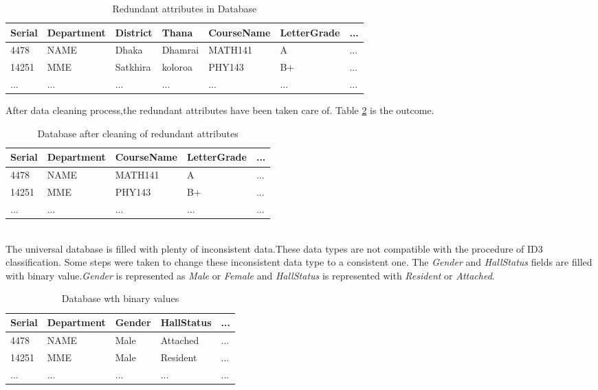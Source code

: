 \begin {table}[H]
\caption {Redundant attributes in Database} \label{tab:ti1}
\begin{center}
\begin{tabular}{ | m{1cm} | m{2cm}| m{1.5cm}| m{1.5cm} | m{2cm} | m{2cm} |  m{0.5cm} | } 
\hline
Serial & Department & District & Thana & CourseName & LetterGrade & ... \\ 
\hline
4478 & NAME & Dhaka & Dhamrai & MATH141 & A & ... \\ 
\hline
14251 & MME & Satkhira & koloroa & PHY143 & B+ & ... \\ 
\hline
... & ... & ... & ... & ... & ... & ... \\ 
\hline
\end{tabular}
\end{center}
\end{table}
After data cleaning process,the redundant attributes have been taken care of. Table \ref{tab:ti2} is the outcome. 
\begin {table}[!H]
\caption {Database after cleaning of redundant attributes} \label{tab:ti2}
\begin{center}
\begin{tabular}{ | m{1cm} |  m{2cm} | m{2cm} | m{2cm} |  m{0.5cm} | } 
\hline
Serial & Department &  CourseName & LetterGrade & ... \\ 
\hline
4478 & NAME & MATH141 & A & ... \\ 
\hline
14251 & MME & PHY143 & B+ & ... \\ 
\hline
... & ... & ... & ... & ... \\ 
\hline
\end{tabular}
\end{center}
\end{table}
\\ The universal database is filled with plenty of inconsistent data.These data types are not compatible with the procedure of ID3 classification. Some steps were taken to change these inconsistent data type to a consistent one. \newline
The \textit{Gender} and \textit{HallStatus} fields are filled with binary value.\textit{Gender} is represented as \textit{Male} or \textit{Female} and \textit{HallStatus} is represented with \textit{Resident} or \textit{Attached}.
\begin {table}[!H]
\caption {Database wth binary values} \label{tab:title}
\begin{center}
\begin{tabular}{ | m{1cm} |  m{2cm} | m{2cm} | m{2cm} |  m{0.5cm} | } 
\hline
Serial & Department &  Gender & HallStatus & ... \\ 
\hline
4478 & NAME & Male & Attached & ... \\ 
\hline
14251 & MME & Male & Resident & ... \\ 
\hline
... & ... & ... & ... & ... \\ 
\hline
\end{tabular}
\end{center}
\end{table}
